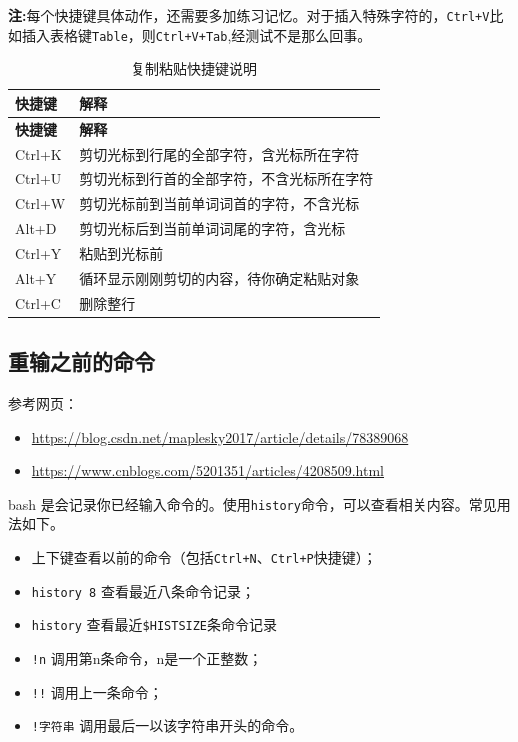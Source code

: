 \documentclass[doctor,openright,twoside]{sjtuthesis}
\providecommand{\tightlist}{%
    \setlength{\itemsep}{0pt}\setlength{\parskip}{0pt}}
\newcommand{\passthrough}[1]{#1}
\theoremstyle{plain}
\theoremstyle{definition}
\theoremstyle{remark}
\theoremstyle{ocrenumbox}
\theoremstyle{plain}
\begin{document}
\textbf{注:}每个快捷键具体动作，还需要多加练习记忆。对于插入特殊字符的，\passthrough{\lstinline!Ctrl+V!}比如插入表格键\passthrough{\lstinline!Table!}，则\passthrough{\lstinline!Ctrl+V+Tab!},经测试不是那么回事。

\begin{longtable}[]{@{}ll@{}}
\caption{复制粘贴快捷键说明\label{tab:cmd:xc-shortkey}}\tabularnewline
\toprule
\textbf{快捷键} & \textbf{解释}\tabularnewline
\midrule
\endfirsthead
\toprule
\textbf{快捷键} & \textbf{解释}\tabularnewline
\midrule
\endhead
Ctrl+K & 剪切光标到行尾的全部字符，含光标所在字符\tabularnewline
Ctrl+U & 剪切光标到行首的全部字符，不含光标所在字符\tabularnewline
Ctrl+W & 剪切光标前到当前单词词首的字符，不含光标\tabularnewline
Alt+D & 剪切光标后到当前单词词尾的字符，含光标\tabularnewline
Ctrl+Y & 粘贴到光标前\tabularnewline
Alt+Y & 循环显示刚刚剪切的内容，待你确定粘贴对象\tabularnewline
Ctrl+C & 删除整行\tabularnewline
\bottomrule
\end{longtable}

\hypertarget{section-45}{%
\subsection{重输之前的命令}\label{section-45}}

参考网页：

\begin{itemize}
\tightlist
\item
  \url{https://blog.csdn.net/maplesky2017/article/details/78389068}
\item
  \url{https://www.cnblogs.com/5201351/articles/4208509.html}
\end{itemize}

bash 是会记录你已经输入命令的。使用\passthrough{\lstinline!history!}命令，可以查看相关内容。常见用法如下。

\begin{itemize}
\tightlist
\item
  上下键查看以前的命令（包括\passthrough{\lstinline!Ctrl+N!}、\passthrough{\lstinline!Ctrl+P!}快捷键）；
\item
  \passthrough{\lstinline!history 8!} 查看最近八条命令记录；
\item
  \passthrough{\lstinline!history!} 查看最近\passthrough{\lstinline!$HISTSIZE!}条命令记录
\item
  \passthrough{\lstinline"!n"} 调用第n条命令，n是一个正整数；
\item
  \passthrough{\lstinline"!!"} 调用上一条命令；
\item
  \passthrough{\lstinline"!字符串"} 调用最后一以该字符串开头的命令。
\end{itemize}
\end{document}
